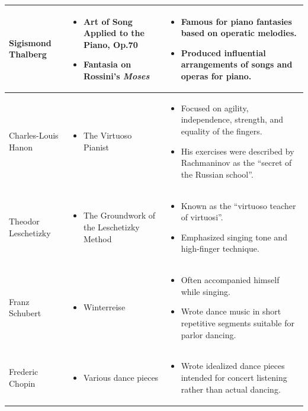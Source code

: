 \documentclass[math,code]{amznotes}
\theoremstyle{remark}
\begin{document}
\begin{longtable}{|p{3cm}|p{6cm}|p{7cm}|}
Sigismond Thalberg &
\begin{itemize}[leftmargin=*]
\item Art of Song Applied to the Piano, Op.70
\item Fantasia on Rossini's \textit{Moses}
\end{itemize}
&
\begin{itemize}[leftmargin=*]
\item Famous for piano fantasies based on operatic melodies.
\item Produced influential arrangements of songs and operas for piano.
\end{itemize}
\\
\hline


Charles-Louis Hanon &
\begin{itemize}[leftmargin=*]
\item The Virtuoso Pianist
\end{itemize}
&
\begin{itemize}[leftmargin=*]
\item Focused on agility, independence, strength, and equality of the fingers.
\item His exercises were described by Rachmaninov as the ``secret of the Russian school''.
\end{itemize}
\\
\hline


Theodor Leschetizky &
\begin{itemize}[leftmargin=*]
\item The Groundwork of the Leschetizky Method
\end{itemize}
&
\begin{itemize}[leftmargin=*]
\item Known as the ``virtuoso teacher of virtuosi''.
\item Emphasized singing tone and high-finger technique.
\end{itemize}
\\
\hline


Franz Schubert &
\begin{itemize}[leftmargin=*]
\item Winterreise
\end{itemize}
&
\begin{itemize}[leftmargin=*]
\item Often accompanied himself while singing.
\item Wrote dance music in short repetitive segments suitable for parlor dancing.
\end{itemize}
\\
\hline


Frederic Chopin &
\begin{itemize}[leftmargin=*]
\item Various dance pieces
\end{itemize}
&
\begin{itemize}[leftmargin=*]
\item Wrote idealized dance pieces intended for concert listening rather than actual dancing.
\end{itemize}
\\
\hline

\end{longtable}
\end{document}
